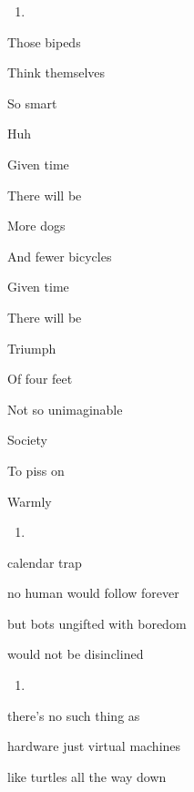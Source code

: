\begin{enumerate}
\def\labelenumi{\arabic{enumi}.}
\item
\end{enumerate}

Those bipeds

Think themselves

So smart

Huh

Given time

There will be

More dogs

And fewer bicycles

Given time

There will be

Triumph

Of four feet

Not so unimaginable

Society

To piss on

Warmly

\begin{enumerate}
\def\labelenumi{\arabic{enumi}.}
\setcounter{enumi}{1}
\item
\end{enumerate}

calendar trap

no human would follow forever

but bots ungifted with boredom

would not be disinclined

\begin{enumerate}
\def\labelenumi{\arabic{enumi}.}
\setcounter{enumi}{2}
\item
\end{enumerate}

there's no such thing as

hardware just virtual machines

like turtles all the way down
